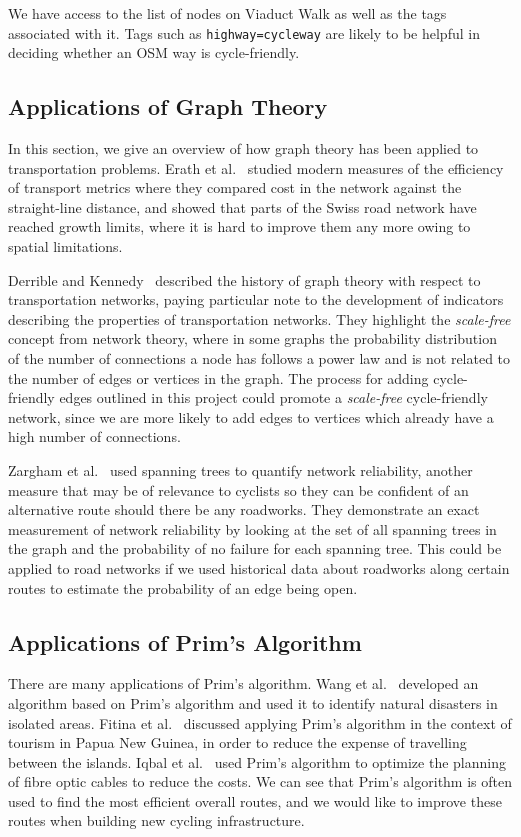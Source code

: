 \documentclass[12pt,a4paper]{report}
\begin{document}
We have access to the list of nodes on Viaduct Walk as well as the tags associated with it. Tags such as \texttt{highway=cycleway} are likely to be helpful in deciding whether an OSM way is cycle-friendly.

\subsection{Applications of Graph Theory}
In this section, we give an overview of how graph theory has been applied to transportation problems. Erath et al.~\cite{erath2009} studied modern measures of the efficiency of transport metrics where they compared cost in the network against the straight-line distance, and showed that parts of the Swiss road network have reached growth limits, where it is hard to improve them any more owing to spatial limitations.

Derrible and Kennedy~\cite{derrible2011} described the history of graph theory with respect to transportation networks, paying particular note to the development of indicators describing the properties of transportation networks. They highlight the \textit{scale-free} concept from network theory, where in some graphs the probability distribution of the number of connections a node has follows a power law and is not related to the number of edges or vertices in the graph. The process for adding cycle-friendly edges outlined in this project could promote a \textit{scale-free} cycle-friendly network, since we are more likely to add edges to vertices which already have a high number of connections. 

Zargham et al.~\cite{zarghami2020} used spanning trees to quantify network reliability, another measure that may be of relevance to cyclists so they can be confident of an alternative route should there be any roadworks. They demonstrate an exact measurement of network reliability by looking at the set of all spanning trees in the graph and the probability of no failure for each spanning tree. This could be applied to road networks if we used historical data about roadworks along certain routes to estimate the probability of an edge being open.

\subsection{Applications of Prim's Algorithm}
There are many applications of Prim's algorithm. Wang et al.~\cite{wang2018} developed an algorithm based on Prim's algorithm and used it to identify natural disasters in isolated areas. Fitina et al.~\cite{fitina} discussed applying Prim's algorithm in the context of tourism in Papua New Guinea, in order to reduce the expense of travelling between the islands. Iqbal et al.~\cite{iqbal2017} used Prim's algorithm to optimize the planning of fibre optic cables to reduce the costs. We can see that Prim's algorithm is often used to find the most efficient overall routes, and we would like to improve these routes when building new cycling infrastructure. 
\end{document}
